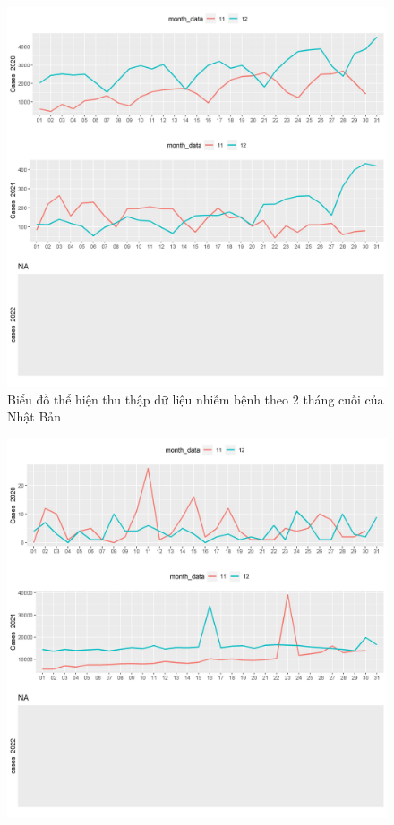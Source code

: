 \documentclass[a4paper]{article}
\theoremstyle{definition}
\begin{document}
\begin{enumerate}[i)]
\begin{enumerate}[1)]
\begin{figure}[htp]
		    \includegraphics[scale = 0.7]{Images/V/v4 Japan .jpeg}
		    \caption{Biểu đồ thể hiện thu thập dữ liệu nhiễm bệnh theo 2 tháng cuối của Nhật Bản}
		    \label{fig:my_label}
		\end{figure}
		\begin{figure}[htp]
		    \centering
		    \includegraphics[scale = 0.7]{Images/V/v4 Vietnam .jpeg}

\end{figure}
\end{enumerate}
\end{enumerate}
\end{document}
